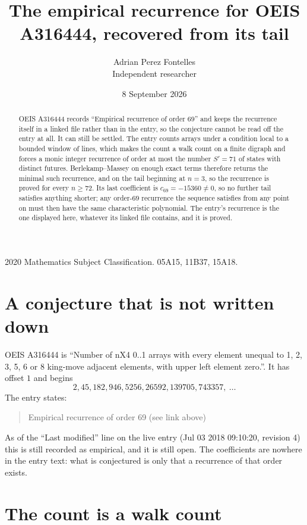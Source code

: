 \documentclass[11pt,a4paper]{article}
\title{The empirical recurrence for OEIS A316444, recovered from its tail}
\author{Adrian Perez Fontelles\\ \small Independent researcher}
\date{8 September 2026}
\theoremstyle{plain}
\theoremstyle{definition}
\begin{document}
\maketitle

\begin{abstract}
OEIS A316444 records ``Empirical recurrence of order $69$'' and keeps the recurrence itself in
a linked file rather than in the entry, so the conjecture cannot be read off the entry at all.
It can still be settled. The entry counts arrays under a condition local to a bounded window of
lines, which makes the count a walk count on a finite digraph and forces a monic integer
recurrence of order at most the number $S'=71$ of states with distinct futures. Berlekamp--Massey on
enough exact terms therefore returns the minimal such recurrence, and on the tail beginning at $n=3$, so the recurrence is proved for every $n\ge72$.
Its last coefficient is $c_{69}=-15360\neq0$, so no further tail satisfies anything
shorter; any order-$69$ recurrence the sequence satisfies from any point on must then have
the same characteristic polynomial. The entry's recurrence is the one displayed here, whatever
its linked file contains, and it is proved.
\end{abstract}

\noindent\small 2020 Mathematics Subject Classification. 05A15, 11B37, 15A18.\normalsize

\section{A conjecture that is not written down}

OEIS A316444 is ``Number of nX4 0..1 arrays with every element unequal to 1, 2, 3, 5, 6 or 8 king-move adjacent elements, with upper left element zero.''. It has offset $1$ and begins
\[
2, 45, 182, 946, 5256, 26592, 139705, 743357,\ \dots
\]
The entry states:
\begin{quote}
Empirical recurrence of order 69 (see link above)
\end{quote}
As of the ``Last modified'' line on the live entry (Jul 03 2018 09:10:20, revision 4)
this is still recorded as empirical, and it is still open. The coefficients are nowhere in the
entry text: what is conjectured is only that a recurrence of that order exists.

\section{The count is a walk count}
\end{document}

